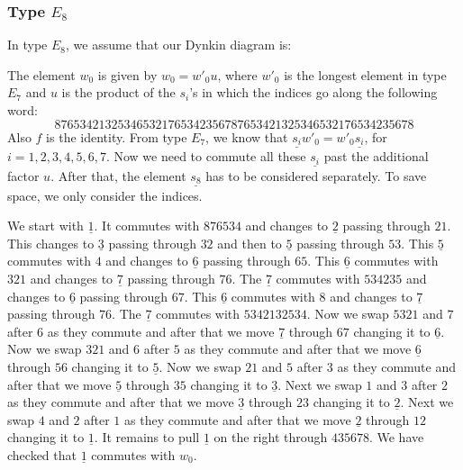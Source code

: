 \documentclass[a4paper]{amsart}
\begin{document}
\subsubsection{\bf Type $E_8$}\label{s5.2.7}

In type $E_8$, we assume that our Dynkin diagram is:


The element $w_0$ is given by $w_0=w'_0u$, 
where $w'_0$ is the longest element in type $E_7$
and $u$ is the product of the $s_i$'s in which the indices
go along the following word:
\begin{displaymath}
876534213253465321765342356787653421325346532176534235678
\end{displaymath}
Also $f$ is the identity. From type $E_7$, we know that 
$\underline{s_{i}}w'_0=w'_0\underline{s_{i}}$, for $i=1,2,3,4,5,6,7$.
Now we need to commute all these $\underline{s_{i}}$ past the
additional factor $u$. After that, the element $\underline{s_{8}}$ has to be 
considered separately. To save space, we only consider the indices.

We start with $\underline{1}$. It commutes with $876534$ 
and changes to $\underline{2}$ passing through $21$.
This changes to  $\underline{3}$ passing through $32$
and then to  $\underline{5}$ passing through $53$.
This $\underline{5}$ commutes with $4$ and 
changes to  $\underline{6}$ passing through $65$.
This $\underline{6}$ commutes with $321$ and 
changes to  $\underline{7}$ passing through $76$.
The $\underline{7}$ commutes with $534235$ and 
changes to  $\underline{6}$ passing through $67$.
This $\underline{6}$ commutes with $8$ and 
changes to  $\underline{7}$ passing through $76$.
The $\underline{7}$ commutes with $5342132534$.
Now we swap $5321$ and $7$ after $6$ as they commute
and after that we move $\underline{7}$ through $67$
changing it to $\underline{6}$.
Now we swap $321$ and $6$ after $5$ as they commute
and after that we move $\underline{6}$ through $56$
changing it to $\underline{5}$.
Now we swap $21$ and $5$ after $3$ as they commute
and after that we move $\underline{5}$ through $35$
changing it to $\underline{3}$.
Next we swap $1$ and $3$ after $2$ as they commute
and after that we move $\underline{3}$ through $23$
changing it to $\underline{2}$.
Next we swap $4$ and $2$ after $1$ as they commute
and after that we move $\underline{2}$ through $12$
changing it to $\underline{1}$. 
It remains to pull $\underline{1}$ on the right
through $435678$. We have checked that 
$\underline{1}$ commutes with $w_0$.
\end{document}
